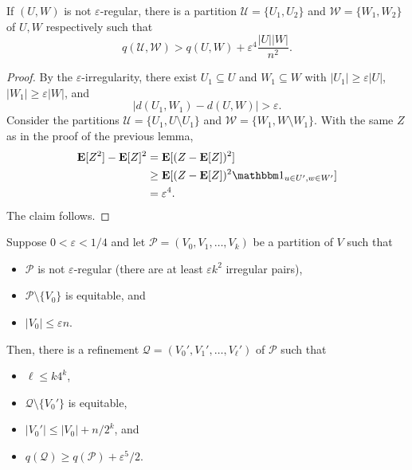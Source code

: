 \documentclass{article}
\begin{document}
			\begin{lemma}
				\label{lemma: szemeredi lemma energy increases for irregular}
				If $(U,W)$ is not $\varepsilon$-regular, there is a partition $\mathcal{U} = \{U_1,U_2\}$ and $\mathcal{W} = \{W_1,W_2\}$ of $U,W$ respectively such that
				\[ q(\mathcal{U},\mathcal{W}) > q(U,W) + \varepsilon^4 \frac{|U||W|}{n^2}. \]
			\end{lemma}
			\begin{proof}
				By the $\varepsilon$-irregularity, there exist $U_1\subseteq U$ and $W_1\subseteq W$ with $|U_1| \ge \varepsilon|U|$, $|W_1| \ge \varepsilon|W|$, and
				\[ |d(U_1,W_1) - d(U,W)| > \varepsilon. \]
				Consider the partitions $\mathcal{U} = \{U_1,U\setminus U_1\}$ and $\mathcal{W} = \{W_1,W\setminus W_1\}$. With the same $Z$ as in the proof of the previous lemma,
				\begin{align*}
					\expec[Z^2] - \expec[Z]^2 &= \expec[(Z - \expec[Z])^2] \\
						&\ge \expec[(Z - \expec[Z])^2 \indic_{u\in U', w\in W'}] \\
						&= \varepsilon^4.
				\end{align*}
				The claim follows.
			\end{proof}

			\begin{flem}
				\label{lemma: final step of szemeredi's regularity lemma}
				Suppose $0 < \varepsilon < 1/4$ and let $\mathcal{P} = (V_0,V_1,\ldots,V_k)$ be a partition of $V$ such that
				\begin{itemize}
				 	\item $\mathcal{P}$ is not $\varepsilon$-regular (there are at least $\varepsilon k^2$ irregular pairs),
				 	\item $\mathcal{P} \setminus \{V_0\}$ is equitable\footnotemark, and
				 	\item $|V_0| \le \varepsilon n$.
				\end{itemize}
				Then, there is a refinement $\mathcal{Q} = (V_0',V_1',\ldots,V_\ell')$ of $\mathcal{P}$ such that
				\begin{itemize}
					\item $\ell \le k 4^k$,
					\item $\mathcal{Q} \setminus \{V_0'\}$ is equitable,
					\item $|V_0'| \le |V_0| + n / 2^k$, and
					\item $q(\mathcal{Q}) \ge q(\mathcal{P}) + \varepsilon^5/2$.
				\end{itemize}
			\end{flem}
\end{document}
